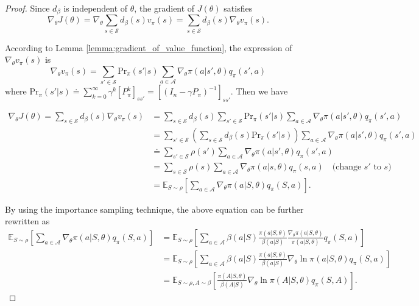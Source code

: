 \documentclass[10pt]{elegantbook}
\begin{document}
\begin{proof}
    Since $d_{\beta}$ is independent of $\theta$, the gradient of $J(\theta)$ satisfies
    \begin{equation}
    \nabla_{\theta} J(\theta) = \nabla_{\theta} \sum_{s \in \mathcal{S}} d_{\beta}(s) v_{\pi}(s) = \sum_{s \in \mathcal{S}} d_{\beta}(s) \nabla_{\theta} v_{\pi}(s).
    \end{equation}

    According to Lemma \ref{lemma:gradient_of_value_function}, the expression of $\nabla_{\theta} v_{\pi}(s)$ is
    \begin{equation}
    \nabla_{\theta} v_{\pi}(s) = \sum_{s' \in \mathcal{S}} \text{Pr}_{\pi}(s'|s) \sum_{a \in \mathcal{A}} \nabla_{\theta} \pi(a|s', \theta) q_{\pi}(s', a)
    \end{equation}
    where $\text{Pr}_{\pi}(s'|s) \doteq \sum_{k=0}^{\infty} \gamma^k [P_{\pi}^k]_{ss'} = [(I_n - \gamma P_{\pi})^{-1}]_{ss'}$. Then we have

    \begin{align*}
    \nabla_{\theta} J(\theta) 
    = \sum_{s \in \mathcal{S}} d_{\beta}(s) \nabla_{\theta} v_{\pi}(s) 
    &= \sum_{s \in \mathcal{S}} d_{\beta}(s) \sum_{s' \in \mathcal{S}} \text{Pr}_{\pi}(s'|s) \sum_{a \in \mathcal{A}} \nabla_{\theta} \pi(a|s', \theta) q_{\pi}(s', a) \\
    &= \sum_{s' \in \mathcal{S}} \left( \sum_{s \in \mathcal{S}} d_{\beta}(s) \text{Pr}_{\pi}(s'|s) \right) \sum_{a \in \mathcal{A}} \nabla_{\theta} \pi(a|s', \theta) q_{\pi}(s', a) \\
    &\doteq \sum_{s' \in \mathcal{S}} \rho(s') \sum_{a \in \mathcal{A}} \nabla_{\theta} \pi(a|s', \theta) q_{\pi}(s', a) \\
    &= \sum_{s \in \mathcal{S}} \rho(s) \sum_{a \in \mathcal{A}} \nabla_{\theta} \pi(a|s, \theta) q_{\pi}(s, a) \quad \text{(change } s' \text{ to } s) \\
    &= \mathbb{E}_{S \sim \rho} \left[ \sum_{a \in \mathcal{A}} \nabla_{\theta} \pi(a|S, \theta) q_{\pi}(S, a) \right].
    \end{align*}

    By using the importance sampling technique, the above equation can be further rewritten as
    \begin{align*}
    \mathbb{E}_{S \sim \rho} \left[ \sum_{a \in \mathcal{A}} \nabla_{\theta} \pi(a|S, \theta) q_{\pi}(S, a) \right]
    &= \mathbb{E}_{S \sim \rho} \left[ \sum_{a \in \mathcal{A}} \beta(a|S) \frac{\pi(a|S, \theta)}{\beta(a|S)} \frac{\nabla_{\theta} \pi(a|S, \theta)}{\pi(a|S, \theta)} q_{\pi}(S, a) \right] \\
    &= \mathbb{E}_{S \sim \rho} \left[ \sum_{a \in \mathcal{A}} \beta(a|S) \frac{\pi(a|S, \theta)}{\beta(a|S)} \nabla_{\theta} \ln \pi(a|S, \theta) q_{\pi}(S, a) \right] \\
    &= \mathbb{E}_{S \sim \rho, A \sim \beta} \left[ \frac{\pi(A|S, \theta)}{\beta(A|S)} \nabla_{\theta} \ln \pi(A|S, \theta) q_{\pi}(S, A) \right].
    \end{align*}
\end{proof}
\end{document}

